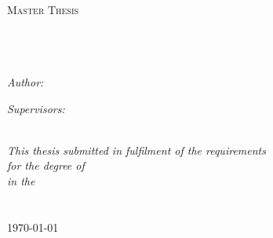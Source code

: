 \documentclass[11pt, oneside]{Thesis} %
\begin{document}
\begin{titlepage}
\begin{center}

\textsc{\LARGE \univname}\\[1.5cm] %
\textsc{\Large Master Thesis}\\[0.5cm] %

\HRule \\[0.4cm] %
{\huge \bfseries \ttitle}\\[0.4cm] %
\HRule \\[1.5cm] %
 
\begin{minipage}{0.4\textwidth}
\begin{flushleft} \large
\emph{Author:}\\
\authornames %
\end{flushleft}
\end{minipage}
\begin{minipage}{0.4\textwidth}
\begin{flushright} \large
\emph{Supervisors:} \\
\supname %
\end{flushright}
\end{minipage}\\[3cm]
 
\large \textit{This thesis submitted in fulfilment of the requirements\\ for the degree of \degreename}\\[0.3cm] %
\textit{in the}\\[0.4cm]
\groupname\\\deptname\\[2cm] %
 
{\large \today}\\[4cm] %
 
\vfill
\end{center}

\end{titlepage}

\end{document}

